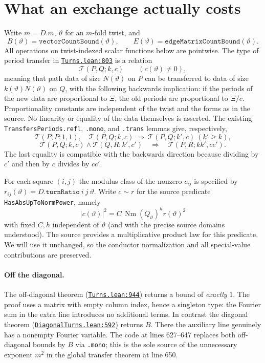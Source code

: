 \documentclass[11pt]{article}
\newcommand{\Tr}{\mathcal T}
\newcommand{\src}[2]{\href{https://github.com/VladimirReshetnikov/ProveIt/blob/main/Analysis/GeneralizedRiemannHypothesis/Lean/grh/src/#1}{#2}}
\newcommand{\code}[1]{\texttt{#1}}
\begin{document}
\section{What an exchange actually costs}
Write $m=D.m$, $\vartheta$ for an $m$-fold twist, and
\[
 B(\vartheta)=\code{vectorCountBound}(\vartheta),\qquad
 E(\vartheta)=\code{edgeMatrixCountBound}(\vartheta).
\]
All operations on twist-indexed scalar functions below are pointwise. The type of period transfer in \src{New/Determinant/AuxiliaryForms/Turns.lean\#L803}{\code{Turns.lean:803}} is a relation
\[
 \Tr(P,Q;k,c)\qquad (c(\vartheta)\ne0),
\]
meaning that path data of size $N(\vartheta)$ on $P$ can be transferred to data of size $k(\vartheta)N(\vartheta)$ on $Q$, with the following backwards implication: if the periods of the new data are proportional to $\Xi$, the old periods are proportional to $\Xi/c$. Proportionality constants are independent of the twist and the forms as in the source. No linearity or equality of the data themselves is asserted. The existing \code{TransfersPeriods.refl}, \code{.mono}, and \code{.trans} lemmas give, respectively,
\[
 \Tr(P,P;1,1),\quad
 \Tr(P,Q;k,c)\ \Rightarrow\ \Tr(P,Q;k',c)\ (k'\ge k),
\]
\[
 \Tr(P,Q;k,c)\wedge\Tr(Q,R;k',c')
 \quad\Rightarrow\quad\Tr(P,R;kk',cc').
\]
The last equality is compatible with the backwards direction because dividing by $c'$ and then by $c$ divides by $cc'$.

For each square $(i,j)$ the modulus class of the nonzero $c_{ij}$ is specified by $r_{ij}(\vartheta)=D.\code{turnRatio}\ i\ j\ \vartheta$. Write $c\sim r$ for the source predicate \code{HasAbsUpToNormPower}, namely
\[
 |c(\vartheta)|^2=C\,\operatorname{Nm}(Q_\vartheta)^h r(\vartheta)^2
\]
with fixed $C,h$ independent of $\vartheta$ (and with the precise source domains understood). The source provides a multiplicative product law for this predicate. We will use it unchanged, so the conductor normalization and all special-value contributions are preserved.

\paragraph{Off the diagonal.} The off-diagonal theorem (\src{New/Determinant/AuxiliaryForms/Turns.lean\#L944}{\code{Turns.lean:944}}) returns a bound of \emph{exactly} $1$. The proof uses a matrix with empty column index, hence a singleton type: the Fourier sum in the extra line introduces no additional terms. In contrast the diagonal theorem (\src{New/Determinant/AuxiliaryForms/DiagonalTurns.lean\#L592}{\code{DiagonalTurns.lean:592}}) returns $B$. There the auxiliary line genuinely has a nonempty Fourier variable. The code at lines 627--647 replaces both off-diagonal bounds by $B$ via \code{.mono}; this is the sole source of the unnecessary exponent $m^2$ in the global transfer theorem at line 650.
\end{document}
